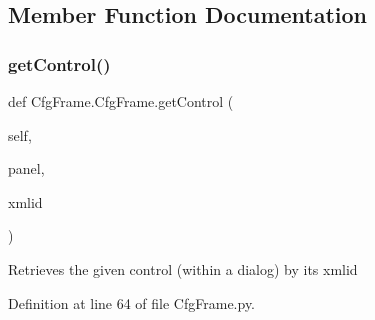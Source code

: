 \subsection{Member Function Documentation}
\mbox{\label{classCfgFrame_1_1CfgFrame_acbf6f510d17cf39882c4968de0629170}} 
\subsubsection{\texorpdfstring{get\+Control()}{getControl()}}
{\footnotesize\ttfamily def Cfg\+Frame.\+Cfg\+Frame.\+get\+Control (\begin{DoxyParamCaption}\item[{}]{self,  }\item[{}]{panel,  }\item[{}]{xmlid }\end{DoxyParamCaption})}

\begin{DoxyVerb}Retrieves the given control (within a dialog) by its xmlid\end{DoxyVerb}
 

Definition at line 64 of file Cfg\+Frame.\+py.



